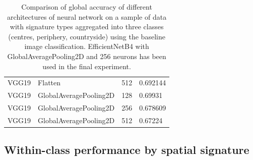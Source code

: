 \documentclass[]{interact}
\theoremstyle{plain}%
\theoremstyle{definition}
\theoremstyle{remark}
\begin{document}
\begin{table}
\begin{tabular}{llll}
           VGG19 &   Flatten &                    512 &  0.692144 \\
           VGG19 &   GlobalAveragePooling2D &                    128 &   0.69931 \\
           VGG19 &   GlobalAveragePooling2D &                    256 &  0.678609 \\
           VGG19 &   GlobalAveragePooling2D &                    512 &   0.67224 \\
    \bottomrule
    \end{tabular}
\caption{\label{tab:app_nns}\footnotesize Comparison of global accuracy of different
architectures of neural network on a sample of data with signature types aggregated into
three classes (centres, periphery, countryside) using the baseline image classification.
EfficientNetB4 with GlobalAveragePooling2D and 256 neurons has been used in the final
experiment.}
\end{table}


\pagebreak

\subsection{Within-class performance by spatial signature}
\label{sec:appendixB}
\end{document}
